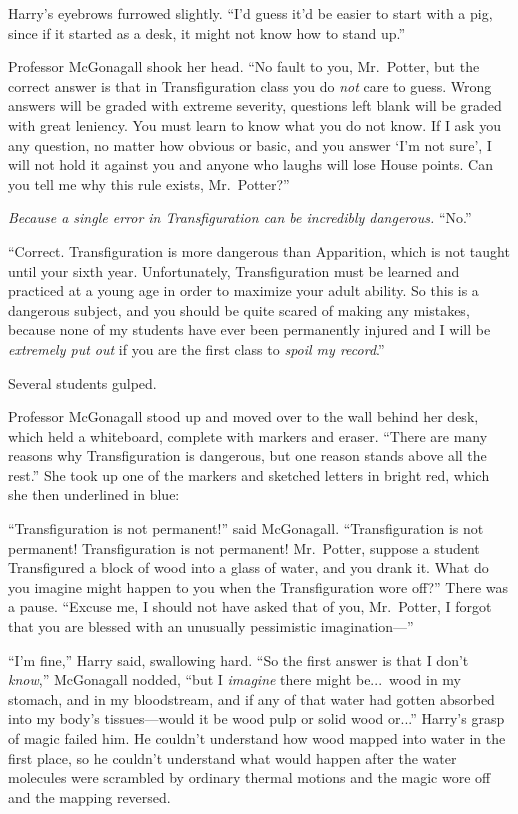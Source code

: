 Harry’s eyebrows furrowed slightly. “I’d guess it’d be easier to start with a pig, since if it started as a desk, it might not know how to stand up.”

Professor McGonagall shook her head. “No fault to you, Mr.~Potter, but the correct answer is that in Transfiguration class you do \emph{not} care to guess. Wrong answers will be graded with extreme severity, questions left blank will be graded with great leniency. You must learn to know what you do not know. If I ask you any question, no matter how obvious or basic, and you answer ‘I’m not sure’, I will not hold it against you and anyone who laughs will lose House points. Can you tell me why this rule exists, Mr.~Potter?”

\emph{Because a single error in Transfiguration can be incredibly dangerous.} “No.”

“Correct. Transfiguration is  more dangerous than Apparition, which is not taught until your sixth year. Unfortunately, Transfiguration must be learned and practiced at a young age in order to maximize your adult ability. So this is a dangerous subject, and you should be quite scared of making any mistakes, because none of my students have ever been permanently injured and I will be \emph{extremely put out} if you are the first class to \emph{spoil my record}.”

Several students gulped.

Professor McGonagall stood up and moved over to the wall behind her desk, which held a whiteboard, complete with markers and eraser. “There are many reasons why Transfiguration is dangerous, but one reason stands above all the rest.” She took up one of the markers and sketched letters in bright red, which she then underlined in blue:


“Transfiguration is not permanent!” said McGonagall. “Transfiguration is not permanent! Transfiguration is not permanent! Mr.~Potter, suppose a student Transfigured a block of wood into a glass of water, and you drank it. What do you imagine might happen to you when the Transfiguration wore off?” There was a pause. “Excuse me, I should not have asked that of you, Mr.~Potter, I forgot that you are blessed with an unusually pessimistic imagination—”

“I’m fine,” Harry said, swallowing hard. “So the first answer is that I don’t \emph{know},” McGonagall nodded, “but I \emph{imagine} there might be...\ wood in my stomach, and in my bloodstream, and if any of that water had gotten absorbed into my body’s tissues—would it be wood pulp or solid wood or...” Harry’s grasp of magic failed him. He couldn’t understand how wood mapped into water in the first place, so he couldn’t understand what would happen after the water molecules were scrambled by ordinary thermal motions and the magic wore off and the mapping reversed.

